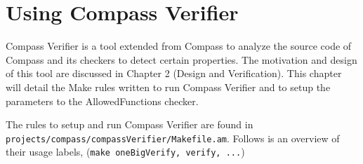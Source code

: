 %
%
%

\chapter{Using Compass Verifier}

	Compass Verifier is a tool extended from Compass to analyze the source
code of Compass and its checkers to detect certain properties. The motivation
and design of this tool are discussed in Chapter 2 (Design and Verification).
This chapter will detail the Make rules written to run Compass 
Verifier and to setup the parameters to the AllowedFunctions checker.

The rules to setup and run Compass Verifier are found in 
{\tt projects/compass/compassVerifier/Makefile.am}. Follows is an overview
of their usage labels, ({\tt make oneBigVerify, verify, ...})
%
